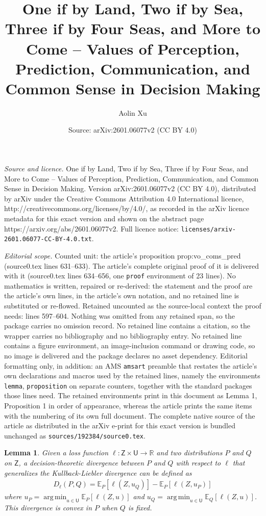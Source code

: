 \documentclass[10pt,a4paper]{amsart}
\title{One if by Land, Two if by Sea, Three if by Four Seas, and More to Come -- Values of Perception, Prediction, Communication, and Common Sense in Decision Making}
\author{Aolin Xu}
\date{Source: arXiv:2601.06077v2 (CC BY 4.0)}
\newtheorem{lemma}{Lemma}
\newcommand{\E}{\mathbb{E}}
\newcommand{\R}{\mathbb{R}}
\DeclareMathOperator*{\argmin}{arg\,min}
\def\sU{{\mathsf U}}
\def\sZ{{\mathsf Z}}
\begin{document}
\maketitle

\noindent\emph{Source and licence.} One if by Land, Two if by Sea, Three if by Four Seas, and More to Come -- Values of Perception, Prediction, Communication, and Common Sense in Decision Making. Version arXiv:2601.06077v2 (CC BY 4.0), distributed by arXiv under the Creative Commons Attribution 4.0 International licence, http://creativecommons.org/licenses/by/4.0/, as recorded in the arXiv licence metadata for this exact version and shown on the abstract page https://arxiv.org/abs/2601.06077v2. Full licence notice: \texttt{licenses/arxiv-2601.06077-CC-BY-4.0.txt}.\par\smallskip

\noindent\textit{Editorial scope.} Counted unit: the article's proposition prop:vo\_coms\_pred (source0.tex lines 631--633). The article's complete original proof of it is delivered with it (source0.tex lines 634--656, one \texttt{proof} environment of 23 lines). No mathematics is written, repaired or re-derived: the statement and the proof are the article's own lines, in the article's own notation, and no retained line is substituted or re-flowed.  Retained uncounted as the source-local context the proof needs: lines 597--604.  Nothing was omitted from any retained span, so the package carries no omission record.  No retained line contains a citation, so the wrapper carries no bibliography and no bibliography entry.  No retained line contains a figure environment, an image-inclusion command or drawing code, so no image is delivered and the package declares no asset dependency.  Editorial formatting only, in addition: an AMS \texttt{amsart} preamble that restates the article's own declarations and macros used by the retained lines, namely the environments \texttt{lemma}, \texttt{proposition} on separate counters, together with the standard packages those lines need.  The retained environments print in this document as Lemma 1, Proposition 1 in order of appearance, whereas the article prints the same items with the numbering of its own full document.  The complete native source of the article as distributed in the arXiv e-print for this exact version is bundled unchanged as \texttt{sources/192384/source0.tex}.
\begin{lemma}\label{lm:D_ell}
Given a loss function $\ell:\sZ\times\sU\rightarrow\R$ and two distributions $P$ and $Q$ on $\sZ$, a decision-theoretic divergence between $P$ and $Q$ with respect to $\ell$ that generalizes the Kullback-Liebler divergence can be defined as
\begin{align}
D_\ell(P,Q) = \E_P[\ell(Z,u_Q)] - \E_P[\ell(Z,u_P)]
\end{align}
where $u_P = \argmin_{u\in\sU}\E_P[\ell(Z,u)]$ and $u_Q = \argmin_{u\in\sU}\E_Q[\ell(Z,u)]$.
This divergence is convex in $P$ when $Q$ is fixed.
\end{lemma}
\end{document}
